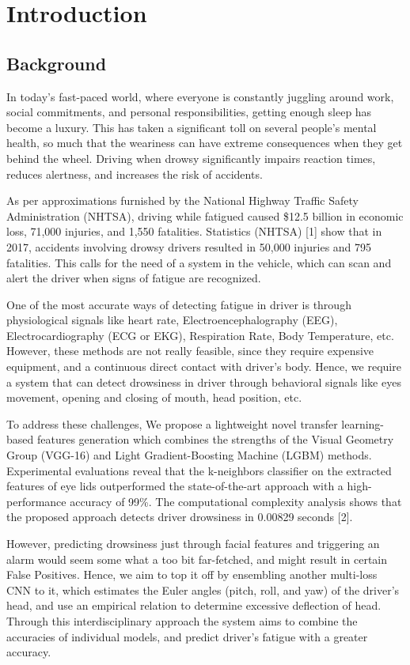 \chapter{Introduction}

\section{Background}

In today's fast-paced world, where everyone is constantly juggling  around work, social commitments, and personal responsibilities, getting enough sleep has become a luxury. This has taken a significant toll on several people's mental health, so much that the weariness can have extreme consequences when they get behind the wheel. Driving when drowsy significantly impairs reaction times, reduces alertness, and increases the risk of accidents.

As per approximations furnished by the National Highway Traffic Safety Administration (NHTSA), driving while fatigued caused \$12.5 billion in economic loss, 71,000 injuries, and 1,550 fatalities. Statistics (NHTSA) [1] show that in 2017, accidents involving drowsy drivers resulted in 50,000 injuries and 795 fatalities. This calls for the need of a system in the vehicle, which can scan and alert the driver when signs of fatigue are recognized.

One of the most accurate ways of detecting fatigue in driver is through physiological signals like heart rate, Electroencephalography (EEG), Electrocardiography (ECG or EKG), Respiration Rate, Body Temperature, etc. However, these methods are not really feasible, since they require expensive equipment, and a continuous direct contact with driver's body. Hence, we require a system that can detect drowsiness in driver through behavioral signals like eyes movement, opening and closing of mouth, head position, etc. 

To address these challenges, We propose a lightweight novel transfer learning-based features generation which combines the strengths of the Visual Geometry Group (VGG-16) and Light Gradient-Boosting Machine (LGBM) methods. Experimental evaluations reveal that the k-neighbors classifier on the extracted features of eye lids outperformed the state-of-the-art approach with a high-performance accuracy of 99\%. The computational complexity analysis shows that the proposed approach detects driver drowsiness in 0.00829 seconds [2].

However, predicting drowsiness just through facial features and triggering an alarm would seem some what a too bit far-fetched, and might result in certain False Positives. Hence, we aim to top it off by ensembling another multi-loss CNN to it, which estimates the Euler angles (pitch, roll, and yaw) of the driver's head, and use an empirical relation to determine excessive deflection of head. Through this interdisciplinary approach the system aims to combine the accuracies of individual models, and predict driver's fatigue with a greater accuracy.


